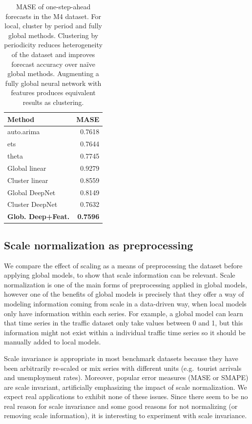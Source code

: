 \documentclass[a4paper]{article}
\theoremstyle{custom}
\begin{document}
\begin{table}[ht]
\centering
\begin{tabular}{lr}
  \toprule
Method                    & MASE \\
  \midrule
auto.arima                & 0.7618 \\
ets                       & 0.7644 \\
theta                     & 0.7745 \\
Global linear             & 0.9279 \\
Cluster linear            & 0.8559 \\
Global DeepNet             & 0.8149 \\
Cluster DeepNet           & 0.7632 \\
\textbf{Glob. Deep+Feat.} & \textbf{0.7596} \\
   \bottomrule
\end{tabular}
\caption{MASE of one-step-ahead forecasts in the M4 dataset. For local, cluster by period and fully global methods. Clustering by periodicity reduces heterogeneity of the dataset and improves forecast accuracy over naïve global methods. Augmenting a fully global neural network with features produces equivalent results as clustering.}
\label{tab:clusterheterog}
\end{table}

\subsection{Scale normalization as preprocessing}
\label{sec:normalizexp}

We compare the effect of scaling as a means of preprocessing the dataset before applying global models, to show that scale information can be relevant. Scale normalization is one of the main forms of preprocessing applied in global models, however one of the benefits of global models is precisely that they offer a way of modeling information coming from scale in a data-driven way, when local models only have information within each series. For example, a global model can learn that time series in the traffic dataset only take values between 0 and 1, but this information might not exist within a individual traffic time series so it should be manually added to local models.

Scale invariance is appropriate in most benchmark datasets because they have been arbitrarily re-scaled or mix series with different units (e.g.\ tourist arrivals and unemployment rates). Moreover, popular error measures (MASE or SMAPE) are scale invariant, artificially emphasizing the impact of scale normalization. We expect real applications to exhibit none of these issues. Since there seem to be no real reason for scale invariance and some good reasons for not normalizing (or removing scale information), it is interesting to experiment with scale invariance.
\end{document}

